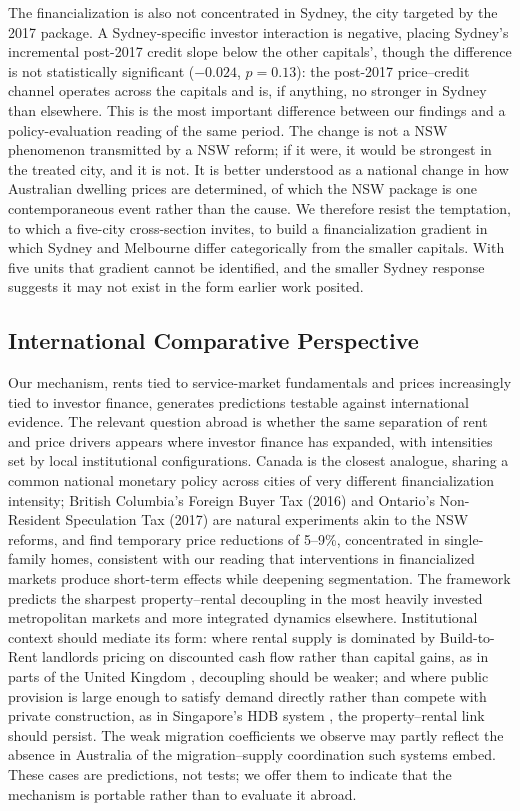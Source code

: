 \documentclass[preprint,11pt,authoryear]{elsarticle}
\begin{document}
The financialization is also not concentrated in Sydney, the city
targeted by the 2017 package. A Sydney-specific investor interaction is
negative, placing Sydney's incremental post-2017 credit slope below the
other capitals', though the difference is not statistically significant
($-0.024$, $p = 0.13$): the post-2017 price--credit channel
operates across the capitals and is, if anything, no stronger in Sydney
than elsewhere. This is the most important difference between our findings
and a policy-evaluation reading of the same period. The change is not a
NSW phenomenon transmitted by a NSW reform; if it were, it would be
strongest in the treated city, and it is not. It is better understood
as a national change in how Australian dwelling prices are determined,
of which the NSW package is one contemporaneous event rather than the
cause. We therefore resist the temptation, to which a five-city
cross-section invites, to build a financialization gradient in which
Sydney and Melbourne differ categorically from the smaller capitals.
With five units that gradient cannot be identified, and the smaller
Sydney response suggests it may not exist in the form earlier work
posited.

\subsection{International Comparative Perspective}
\label{sec:international}

Our mechanism, rents tied to service-market fundamentals and prices
increasingly tied to investor finance, generates predictions testable
against international evidence. The relevant question abroad is whether
the same separation of rent and price drivers appears where investor
finance has expanded, with intensities set by local institutional
configurations. Canada is the closest analogue, sharing a common national
monetary policy across cities of very different financialization
intensity; British Columbia's Foreign Buyer Tax (2016) and Ontario's
Non-Resident Speculation Tax (2017) are natural experiments akin to the
NSW reforms, and \citet{du2022foreign} find temporary price reductions of
5--9\%, concentrated in single-family homes, consistent with our reading
that interventions in financialized markets produce short-term effects
while deepening segmentation. The framework predicts the sharpest
property--rental decoupling in the most heavily invested metropolitan
markets and more integrated dynamics elsewhere. Institutional context
should mediate its form: where rental supply is dominated by Build-to-Rent
landlords pricing on discounted cash flow rather than capital gains, as in
parts of the United Kingdom \citep{hilber2016impact}, decoupling should be
weaker; and where public provision is large enough to satisfy demand
directly rather than compete with private construction, as in Singapore's
HDB system \citep{phang2018policy}, the property--rental link should
persist. The weak migration coefficients we observe may partly reflect the
absence in Australia of the migration--supply coordination such systems
embed. These cases are predictions, not tests; we offer them to indicate
that the mechanism is portable rather than to evaluate it abroad.
\end{document}
